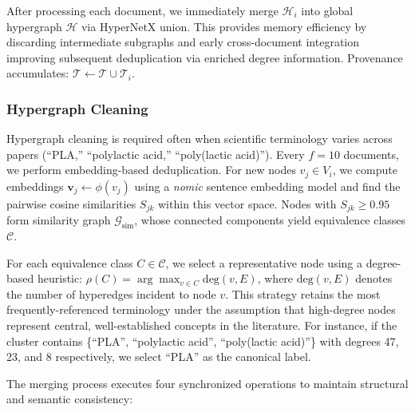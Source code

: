 \documentclass{article}
\begin{document}
After processing each document, we immediately merge $\mathcal{H}_i$ into global hypergraph $\mathcal{H}$ via HyperNetX union. This provides memory efficiency by discarding intermediate subgraphs and early cross-document integration improving subsequent deduplication via enriched degree information. Provenance accumulates: $\mathcal{T} \leftarrow \mathcal{T} \cup \mathcal{T}_i$.

\subsubsection{Hypergraph Cleaning}
Hypergraph cleaning is required often when scientific terminology varies across papers (``PLA,'' ``polylactic acid,'' ``poly(lactic acid)''). Every $f = 10$ documents, we perform embedding-based deduplication. For new nodes $v_j \in V_i$, we compute embeddings $\mathbf{v}_j \leftarrow \phi(v_j)$ using a \emph{nomic} sentence embedding model and find the pairwise cosine similarities $S_{jk}$ within this vector space. Nodes with $S_{jk} \geq 0.95$ form similarity graph $\mathcal{G}_{\text{sim}}$, whose connected components yield equivalence classes $\mathcal{C}$.

For each equivalence class $C \in \mathcal{C}$, we select a representative node using a degree-based heuristic: $\rho(C) = \arg\max_{v \in C} \text{deg}(v, E)$, where $\text{deg}(v, E)$ denotes the number of hyperedges incident to node $v$. This strategy retains the most frequently-referenced terminology under the assumption that high-degree nodes represent central, well-established concepts in the literature. For instance, if the cluster contains \{``PLA'', ``polylactic acid'', ``poly(lactic acid)''\} with degrees 47, 23, and 8 respectively, we select ``PLA'' as the canonical label.

The merging process executes four synchronized operations to maintain structural and semantic consistency:
\end{document}
